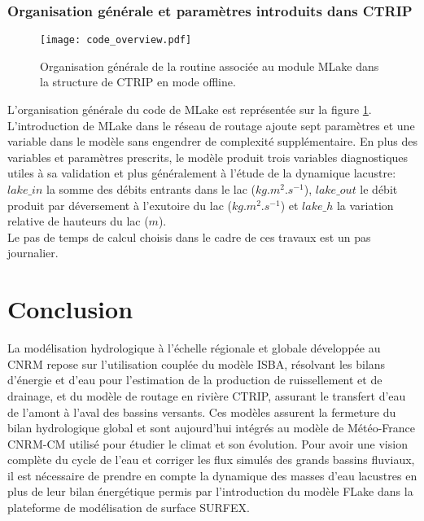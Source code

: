 \subsubsection{{\selectfont Organisation générale et paramètres introduits dans CTRIP}}
\begin{figure}
  \texttt{[image: code\_overview.pdf]}
  \caption{Organisation générale de la routine associée au module MLake dans la structure de CTRIP en mode offline.}
  \label{codeoverview}
\end{figure}
\noindent L'organisation générale du code de MLake est représentée sur la figure \ref{codeoverview}. L'introduction de MLake dans le réseau de routage ajoute sept paramètres et une variable dans le modèle sans engendrer de complexité supplémentaire. En plus des variables et paramètres prescrits, le modèle produit trois variables diagnostiques utiles à sa validation et plus généralement à l'étude de la dynamique lacustre: $lake\_in$ la somme des débits entrants dans le lac ($kg.m^{2}.s^{-1}$), $lake\_out$ le débit produit par déversement à l'exutoire du lac ($kg.m^{2}.s^{-1}$) et $lake\_h$ la variation relative de hauteurs du lac ($m$).\\
Le pas de temps de calcul choisis dans le cadre de ces travaux est un pas journalier.
\clearpage

\section{{\selectfont Conclusion}}

La modélisation hydrologique à l'échelle régionale et globale développée au CNRM repose sur l'utilisation couplée du modèle ISBA, résolvant les bilans d'énergie et d'eau pour l'estimation de la production de ruissellement et de drainage, et du modèle de routage en rivière CTRIP, assurant le transfert d'eau de l'amont à l'aval des bassins versants. Ces modèles assurent la fermeture du bilan hydrologique global et sont aujourd'hui intégrés au modèle de Météo-France CNRM-CM utilisé pour étudier le climat et son évolution. Pour avoir une vision complète du cycle de l'eau et corriger les flux simulés des grands bassins fluviaux, il est nécessaire de prendre en compte la dynamique des masses d'eau lacustres en plus de leur bilan énergétique permis par l'introduction du modèle FLake dans la plateforme de modélisation de surface SURFEX. \\

